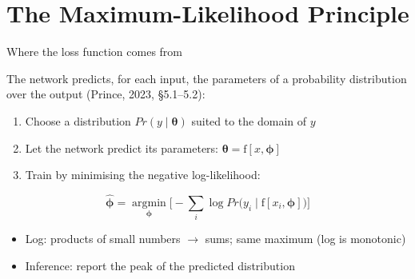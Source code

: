\documentclass[aspectratio=169, 11pt]{beamer}
\newcommand{\src}[3]{}      %
\begin{document}
\section{The Maximum-Likelihood Principle}

\begin{frame}{Where the loss function comes from}
  \src{prince2023}{equation}{5.6}
  \src{prince2023}{section}{5.2}
  \src{prince2023}{section}{5.1}
  The network predicts, for each input, the
  \alert{parameters of a probability distribution} over
  the output (Prince, 2023, \S5.1--5.2):
  \vspace{0.2em}
  \begin{enumerate}\setlength{\itemsep}{2pt}
    \item Choose a distribution
          $Pr(y\mid\bm\theta)$ suited to the
          \alert{domain of $y$}
    \item Let the network predict its parameters:
          $\bm\theta = \mathrm{f}[x,\bm\phi]$
    \item Train by minimising the
          \alert{negative log-likelihood}:
  \end{enumerate}
  \[
    \hat{\bm\phi} = \operatorname*{argmin}_{\bm\phi}
    \Big[-\sum_{i}
    \log Pr\big(y_i \mid \mathrm{f}[x_i,\bm\phi]\big)
    \Big]
  \]
  \begin{itemize}\setlength{\itemsep}{1pt}
    \item Log: products of small numbers $\to$ sums;
          same maximum (log is monotonic)
    \item Inference: report the \alert{peak} of the
          predicted distribution
  \end{itemize}
\end{frame}
\end{document}
